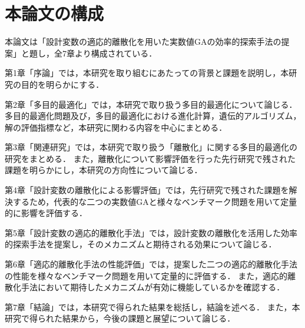 \documentclass[../main/main]{subfiles}
\begin{document}
\section{本論文の構成}
\quad 本論文は「設計変数の適応的離散化を用いた実数値GAの効率的探索手法の提案」と題し，全7章より構成されている．

第1章「序論」では，本研究を取り組むにあたっての背景と課題を説明し，本研究の目的を明らかにする．

第2章「多目的最適化」では，本研究で取り扱う多目的最適化について論じる．
 多目的最適化問題及び，多目的最適化における進化計算，遺伝的アルゴリズム，解の評価指標など，本研究に関わる内容を中心にまとめる．

第3章「関連研究」では，本研究で取り扱う「離散化」に関する多目的最適化の研究をまとめる．
また，離散化について影響評価を行った先行研究で残された課題を明らかにし，本研究の方向性について論じる．

第4章「設計変数の離散化による影響評価」では，先行研究で残された課題を解決するため，代表的な二つの実数値GAと様々なベンチマーク問題を用いて定量的に影響を評価する．

第5章「設計変数の適応的離散化手法」では，設計変数の離散化を活用した効率的探索手法を提案し，そのメカニズムと期待される効果について論じる．

第6章「適応的離散化手法の性能評価」では，提案した二つの適応的離散化手法の性能を様々なベンチマーク問題を用いて定量的に評価する．
また，適応的離散化手法において期待したメカニズムが有効に機能しているかを確認する．

第7章「結論」では，本研究で得られた結果を総括し，結論を述べる．
また，本研究で得られた結果から，今後の課題と展望について論じる．
% 
% 
% 
% 
% 
% 
% 
\end{document}
